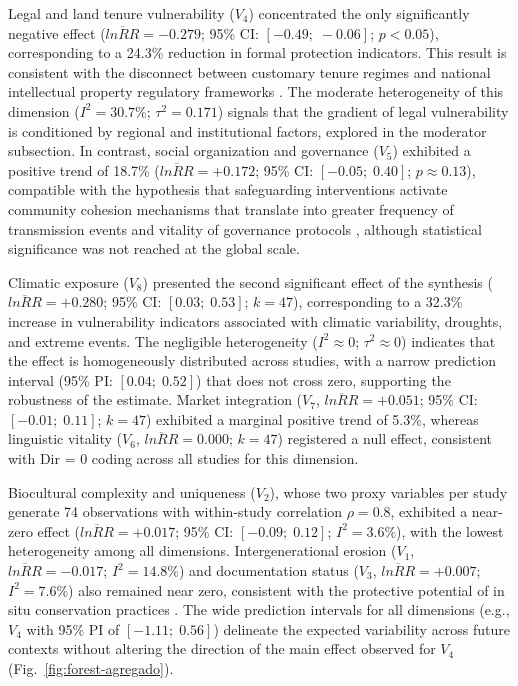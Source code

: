 \documentclass[12pt,a4paper]{article}
\begin{document}
Legal and land tenure vulnerability ($V_4$) concentrated the only significantly negative effect ($\overline{lnRR} = -0.279$; 95\% CI: $[-0.49;\; -0.06]$; $p < 0.05$), corresponding to a 24.3\% reduction in formal protection indicators. This result is consistent with the disconnect between customary tenure regimes and national intellectual property regulatory frameworks \citep{Santilli2009,Dutfield2004,Cottier2004}. The moderate heterogeneity of this dimension ($I^2 = 30.7\%$; $\tau^2 = 0.171$) signals that the gradient of legal vulnerability is conditioned by regional and institutional factors, explored in the moderator subsection. In contrast, social organization and governance ($V_5$) exhibited a positive trend of 18.7\% ($\overline{lnRR} = +0.172$; 95\% CI: $[-0.05;\; 0.40]$; $p \approx 0.13$), compatible with the hypothesis that safeguarding interventions activate community cohesion mechanisms that translate into greater frequency of transmission events and vitality of governance protocols \citep{Ostrom1990,Berkes2007,Rathwell2015}, although statistical significance was not reached at the global scale.

Climatic exposure ($V_8$) presented the second significant effect of the synthesis ($\overline{lnRR} = +0.280$; 95\% CI: $[0.03;\; 0.53]$; $k = 47$), corresponding to a 32.3\% increase in vulnerability indicators associated with climatic variability, droughts, and extreme events. The negligible heterogeneity ($I^2 \approx 0$; $\tau^2 \approx 0$) indicates that the effect is homogeneously distributed across studies, with a narrow prediction interval (95\% PI: $[0.04;\; 0.52]$) that does not cross zero, supporting the robustness of the estimate. Market integration ($V_7$, $\overline{lnRR} = +0.051$; 95\% CI: $[-0.01;\; 0.11]$; $k = 47$) exhibited a marginal positive trend of 5.3\%, whereas linguistic vitality ($V_6$, $\overline{lnRR} = 0.000$; $k = 47$) registered a null effect, consistent with Dir = 0 coding across all studies for this dimension.

Biocultural complexity and uniqueness ($V_2$), whose two proxy variables per study generate 74 observations with within-study correlation $\rho = 0.8$, exhibited a near-zero effect ($\overline{lnRR} = +0.017$; 95\% CI: $[-0.09;\; 0.12]$; $I^2 = 3.6\%$), with the lowest heterogeneity among all dimensions. Intergenerational erosion ($V_1$, $\overline{lnRR} = -0.017$; $I^2 = 14.8\%$) and documentation status ($V_3$, $\overline{lnRR} = +0.007$; $I^2 = 7.6\%$) also remained near zero, consistent with the protective potential of in situ conservation practices \citep{Brush2004}. The wide prediction intervals for all dimensions (e.g., $V_4$ with 95\% PI of $[-1.11;\; 0.56]$) delineate the expected variability across future contexts without altering the direction of the main effect observed for $V_4$ (Fig.~\ref{fig:forest-agregado}).
\end{document}
